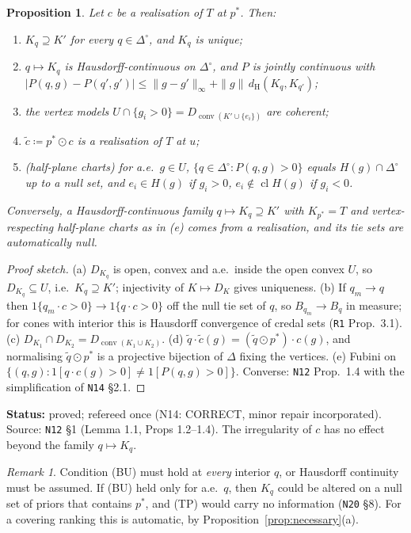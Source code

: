 \documentclass[11pt]{article}
\newtheorem{proposition}[theorem]{Proposition}
\theoremstyle{definition}
\theoremstyle{remark}
\newtheorem{remark}[theorem]{Remark}
\newcommand{\Di}{\Delta^{\circ}}
\newcommand{\cl}{\operatorname{cl}}
\newcommand{\co}{\operatorname{conv}}
\newcommand{\dH}{d_{\mathrm H}}
\newcommand{\src}[1]{\texttt{#1}}
\newcommand{\status}[1]{\par\smallskip\noindent\textbf{Status:} #1\par\smallskip}
\begin{document}
\begin{proposition}\label{prop:reduction}
Let $c$ be a realisation of $T$ at $p^*$. Then:
\begin{enumerate}[leftmargin=*,label=(\alph*)]
\item $K_q\supseteq K'$ for every $q\in\Di$, and $K_q$ is unique;
\item $q\mapsto K_q$ is Hausdorff-continuous on $\Di$, and $P$ is jointly continuous with $|P(q,g)-P(q',g')|\le\|g-g'\|_\infty+\|g\|\,\dH(K_q,K_{q'})$;
\item the vertex models $U\cap\{g_i>0\}=D_{\co(K'\cup\{e_i\})}$ are coherent;
\item $\tilde c\coloneqq p^*\odot c$ is a realisation of $T$ at $u$;
\item \emph{(half-plane charts)} for a.e.\ $g\in U$, $\{q\in\Di:P(q,g)>0\}$ equals $H(g)\cap\Di$ up to a null set, and $e_i\in H(g)$ if $g_i>0$, $e_i\notin\cl H(g)$ if $g_i<0$.
\end{enumerate}
Conversely, a Hausdorff-continuous family $q\mapsto K_q\supseteq K'$ with $K_{p^*}=T$ and vertex-respecting half-plane charts as in (e) comes from a realisation, and its tie sets are automatically null.
\end{proposition}
\begin{proof}[Proof sketch]
(a) $D_{K_q}$ is open, convex and a.e.\ inside the open convex $U$, so $D_{K_q}\subseteq U$, i.e.\ $K_q\supseteq K'$; injectivity of $K\mapsto D_K$ gives uniqueness. (b) If $q_m\to q$ then $1\{q_m\cdot c>0\}\to1\{q\cdot c>0\}$ off the null tie set of $q$, so $B_{q_m}\to B_q$ in measure; for cones with interior this is Hausdorff convergence of credal sets (\src{R1} Prop.~3.1). (c) $D_{K_1}\cap D_{K_2}=D_{\co(K_1\cup K_2)}$. (d) $\tilde q\cdot\tilde c(g)=(\tilde q\odot p^*)\cdot c(g)$, and normalising $\tilde q\odot p^*$ is a projective bijection of $\Delta$ fixing the vertices. (e) Fubini on $\{(q,g):1[q\cdot c(g)>0]\ne1[P(q,g)>0]\}$. Converse: \src{N12} Prop.~1.4 with the simplification of \src{N14} \S2.1.
\end{proof}
\status{proved; refereed once (N14: CORRECT, minor repair incorporated). Source: \src{N12} \S1 (Lemma 1.1, Props 1.2--1.4). The irregularity of $c$ has no effect beyond the family $q\mapsto K_q$.}

\begin{remark}\label{rem:N20}
Condition (BU) must hold at \emph{every} interior $q$, or Hausdorff continuity must be assumed. If (BU) held only for a.e.\ $q$, then $K_q$ could be altered on a null set of priors that contains $p^*$, and (TP) would carry no information (\src{N20} \S8). For a covering ranking this is automatic, by Proposition~\ref{prop:necessary}(a).
\end{remark}
\end{document}
